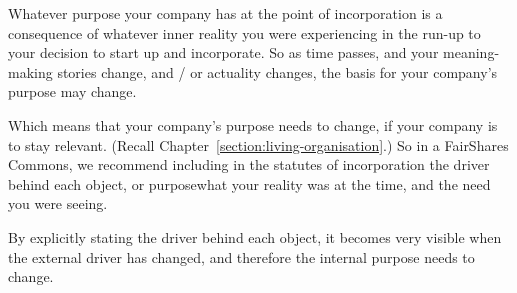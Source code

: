 Whatever purpose your company has at the point of incorporation is a consequence of whatever inner reality you were experiencing in the run-up to your decision to start up and incorporate. So as time passes, and your meaning\hyp{}making stories change, and / or actuality changes, the basis for your company's purpose may change. 


Which means that your company's purpose needs to change, if your company is to stay relevant. (Recall Chapter~\ref{section:living-organisation}.) So in a FairShares Commons, we recommend including in the statutes of incorporation the driver behind each object, or purpose\textemdash what your reality was at the time, and the need you were seeing. 


By explicitly stating the driver behind each object, it becomes very visible when the external driver has changed, and therefore the internal purpose needs to change.
